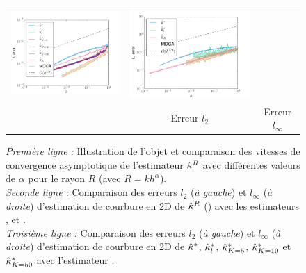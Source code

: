 \begin{figure}[ht]
\begin{center}
\begin{tabular}{@{}l c c @{}}
      \includegraphics[width=7cm]{graphs/Ellipse_PF_L2} &
      \includegraphics[width=7cm]{graphs/Ellipse_PF_Loo}
      \\
      &
      Erreur $l_2$ &
      Erreur $l_\infty$
    \end{tabular}
    \caption[Évaluation expérimentale sur l'objet \Ellipse.]{
      \emph{Première ligne :} Illustration de l'objet \Ellipse et comparaison
      des vitesses de convergence asymptotique de l'estimateur $\hat{\kappa}^{R}$ avec
      différentes valeurs de $\alpha$ pour le rayon $R$ (avec $R=kh^\alpha$).
      \\
      \emph{Seconde ligne :} Comparaison des erreurs $l_2$ (\emph{à gauche}) et
      $l_\infty$ (\emph{à droite}) d'estimation de courbure en 2D de $\hat{\kappa}^{R}$
      (\II) avec les estimateurs \BC \cite{Esbelin2011}, \MDSS
      \cite{Coeurjolly2001,deVieilleville2007} et \MDCA \cite{Roussillon2011}.
      \\
      \emph{Troisième ligne :} Comparaison des erreurs $l_2$ (\emph{à gauche})
      et $l_\infty$ (\emph{à droite}) d'estimation de courbure en 2D de $\hat{\kappa}^{*}$,
      $\hat{\kappa}^{*}_{l}$, $\hat{\kappa}^{*}_{K=5}$, $\hat{\kappa}^{*}_{K=10}$ et $\hat{\kappa}^{*}_{K=50}$ avec
      l'estimateur \MDCA \cite{Roussillon2011}.
      }
      \label{fig:curv-experiments-ellipse}
  \end{center}
\end{figure}
%
